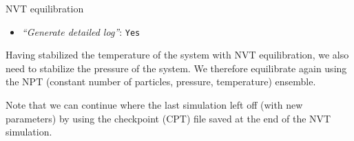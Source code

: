 \documentclass[twocolumn]{bmcart}%
\providecommand{\tightlist}{%
  \setlength{\itemsep}{0pt}\setlength{\parskip}{0pt}}
\begin{document}
\begin{handson_box_colour}{NVT
equilibration}
\begin{itemize}
\begin{itemize}
      \begin{itemize}
      \tightlist
      \item
        \emph{``Bond constraints (constraints)''}:
        \texttt{All\ bonds\ (all-bonds).}
      \item
        \emph{``Temperature /K''}: \texttt{300}
      \item
        \emph{``Step length in ps''}: \texttt{0.0002}
      \item
        \emph{``Number of steps that elapse between saving data points
        (velocities, forces, energies)''}: \texttt{1000}
      \item
        \emph{``Number of steps for the simulation''}: \texttt{50000}
      \end{itemize}
    \end{itemize}
  \item
    \emph{``Generate detailed log''}: \texttt{Yes}
  \end{itemize}

\end{handson_box_colour}

Having stabilized the temperature of the system with NVT equilibration,
we also need to stabilize the pressure of the system. We therefore
equilibrate again using the NPT (constant number of particles, pressure,
temperature) ensemble.

Note that we can continue where the last simulation left off (with new
parameters) by using the checkpoint (CPT) file saved at the end of the
NVT simulation.
\end{document}
